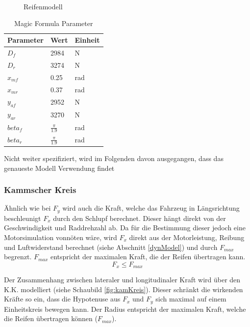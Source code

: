 \documentclass{like}
\begin{document}
\begin{figure}[ht!]
	\centering
	 
	\caption{Reifenmodell}
	\label{fig:pacejka}
\end{figure}



\begin{table}[]
	\centering
	\begin{tabular}{l|l|l}
		\hline
		Parameter	&  Wert  & Einheit \\ \hline
		\(D_f\)		&  2984 & N \\
		\(D_r\)		&  3274 & N \\
		\(x_{mf}\)	&  0.25 & rad \\
		\(x_{mr}\)	&  0.37 & rad \\
		\(y_{af}\)	&  2952 & N \\
 		\(y_{ar}\)	&  3270 & N \\
		\(beta_{f}\)	&  $\frac{\pi}{1.9}$ & rad \\
		\(beta_{r}\)	&  $\frac{\pi}{1.9}$ & rad \\
		
	\end{tabular}
	\caption{Magic Formula Parameter}
	\label{tireParam}
\end{table}

Nicht weiter spezifiziert, wird im Folgenden davon ausgegangen, dass das genaueste Modell Verwendung findet



\subsubsection*{Kammscher Kreis}

Ähnlich wie bei \(F_y\) wird auch die Kraft, welche das Fahrzeug in Längsrichtung beschleunigt \(F_x\) durch den Schlupf berechnet. Dieser hängt direkt von der Geschwindigkeit und Raddrehzahl ab. 
Da für die Bestimmung dieser jedoch eine Motorsimulation vonnöten wäre, wird \(F_x\) direkt aus der Motorleistung, Reibung und Luftwiderstand berechnet (siehe Abschnitt \ref{dynModel}) und durch \(F_{max}\) begrenzt. \(F_{max}\) entspricht der maximalen Kraft, die der Reifen übertragen kann.\\
\begin{equation}
F_x \leq F_{max}
\end{equation}

Der Zusammenhang zwischen lateraler und longitudinaler Kraft wird über den \ac{K.K.} modelliert (siehe Schaubild \ref{fig:kamKreis}). Dieser schränkt die wirkenden Kräfte so ein, dass die Hypotenuse aus \(F_x\) und \(F_y\) sich maximal auf einem Einheitskreis bewegen kann. Der Radius entspricht der maximalen Kraft, welche die Reifen übertragen können (\(F_{max}\)).
\end{document}
